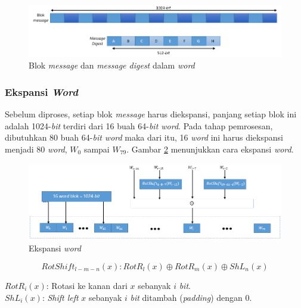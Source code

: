 \begin{figure}[H]
	\includegraphics[scale=0.6]{Gambar/message_block_digest_as_words}
	\centering
	\caption{Blok \textit{message} dan \textit{message digest} dalam \textit{word}}\label{fig:blokmessagedigest}
\end{figure}

\subsubsection{Ekspansi \textit{Word}}
\label{sssec:ekspansi_word}
Sebelum diproses, setiap blok \textit{message} harus diekspansi, panjang setiap blok ini adalah 1024-\textit{bit} terdiri dari 16 buah 64-\textit{bit word}. Pada tahap pemrosesan, dibutuhkan 80 buah 64-\textit{bit word} maka dari itu, 16 \textit{word} ini harus diekspansi menjadi 80 \textit{word}, \begin{math}W_0\end{math} sampai \begin{math}W_79\end{math}. Gambar \ref{fig:wordexpand} menunjukkan cara ekspansi \textit{word}.

\begin{figure}[H]
	\includegraphics[scale=0.5]{Gambar/word_expansion}
	\centering
	\caption{Ekspansi \textit{word}}\label{fig:wordexpand}
\end{figure}

\begin{displaymath}
	RotShift_{l-m-n}(x):RotR_l(x) \oplus RotR_m(x) \oplus ShL_n(x)
\end{displaymath}

\noindent \begin{math}RotR_i(x)\end{math}: Rotasi ke kanan dari \begin{math}x\end{math} sebanyak \begin{math}i\end{math} \textit{bit}.\\
\begin{math}ShL_i(x)\end{math}: \textit{Shift left} \begin{math}x\end{math} sebanyak \begin{math}i\end{math} \textit{bit} ditambah (\textit{padding}) dengan 0.

